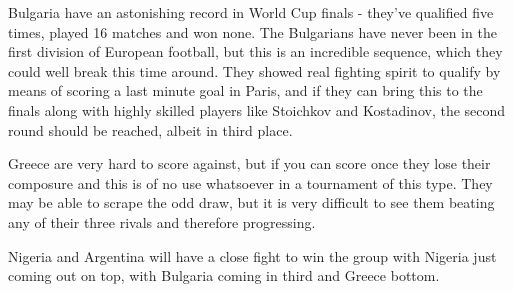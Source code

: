 Bulgaria have an astonishing record in World Cup finals - they've qualified 
five times, played 16 matches and won none. The Bulgarians have never been in 
the first division of European football, but this is an incredible sequence, 
which they could well break this time around. They showed real fighting spirit
to qualify by means of scoring a last minute goal in Paris, and if they can 
bring this to the finals along with highly skilled players like Stoichkov and
Kostadinov, the second round should be reached, albeit in third place.

Greece are very hard to score against, but if you can score once they lose 
their composure and this is of no use whatsoever in a tournament of this type. 
They may be able to scrape the odd draw, but it is very difficult to see them 
beating any of their three rivals and therefore progressing.

Nigeria and Argentina will have a close fight to win the group with Nigeria 
just coming out on top, with Bulgaria coming in third and Greece bottom.
